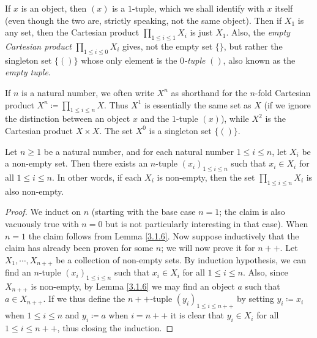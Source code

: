 \begin{note}
If \(x\) is an object, then \((x)\) is a \(1\)-tuple, which we shall identify with \(x\) itself (even though the two are, strictly speaking, not the same object).
Then if \(X_1\) is any set, then the Cartesian product \(\prod_{1 \leq i \leq 1} X_i\) is just \(X_1\).
Also, the \emph{empty Cartesian product} \(\prod_{1 \leq i \leq 0} X_i\) gives, not the empty set \(\{\}\), but rather the singleton set \(\{()\}\) whose only element is the \emph{\(0\)-tuple} \(()\), also known as the \emph{empty tuple}.
\end{note}

\begin{note}
If \(n\) is a natural number, we often write \(X^n\) as shorthand for the \(n\)-fold Cartesian product \(X^n \coloneqq \prod_{1 \leq i \leq n} X\).
Thus \(X^1\) is essentially the same set as \(X\) (if we ignore the distinction between an object \(x\) and the \(1\)-tuple \((x)\)), while \(X^2\) is the Cartesian product \(X \times X\).
The set \(X^0\) is a singleton set \(\{()\}\).
\end{note}

\setcounter{theorem}{11}
\begin{lemma}\label{3.5.12}
Let \(n \geq 1\) be a natural number, and for each natural number \(1 \leq i \leq n\), let \(X_i\) be a non-empty set.
Then there exists an \(n\)-tuple \((x_i)_{1 \leq i \leq n}\) such that \(x_i \in X_i\) for all \(1 \leq i \leq n\).
In other words, if each \(X_i\) is non-empty, then the set \(\prod_{1 \leq i \leq n} X_i\) is also non-empty.
\end{lemma}

\begin{proof}
We induct on \(n\) (starting with the base case \(n = 1\); the claim is also vacuously true with \(n = 0\) but is not particularly interesting in that case).
When \(n = 1\) the claim follows from Lemma \ref{3.1.6}.
Now suppose inductively that the claim has already been proven for some \(n\);
we will now prove it for \(n++\).
Let \(X_1, \cdots, X_{n++}\) be a collection of non-empty sets.
By induction hypothesis, we can find an \(n\)-tuple \((x_i)_{1 \leq i \leq n}\) such that \(x_i \in X_i\) for all \(1 \leq i \leq n\).
Also, since \(X_{n++}\) is non-empty, by Lemma \ref{3.1.6} we may find an object \(a\) such that \(a \in X_{n++}\).
If we thus define the \(n++\)-tuple \((y_i)_{1 \leq i \leq n++}\) by setting \(y_i \coloneqq x_i\) when \(1 \leq i \leq n\) and \(y_i \coloneqq a\) when \(i = n++\) it is clear that \(y_i \in X_i\) for all \(1 \leq i \leq n++\), thus closing the induction.
\end{proof}

